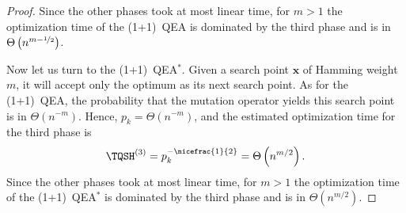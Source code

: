 \begin{proof}
Since the other phases took at most linear time, for $m>1$ the optimization time of the (1+1)~QEA is dominated by the third phase and is in $\Theta\left(n^{m-\nicefrac{1}{2}}\right)$.

Now let us turn to the (1+1)~QEA$^*$. Given a search point $\mathbf{x}$ of Hamming weight $m$, it will accept only the optimum as its next search point. As for the (1+1)~QEA, the probability that the mutation operator yields this search point is in $\Theta(n^{-m})$. Hence, $p_k = \Theta(n^{-m})$, and the estimated optimization time for the third phase is
\[
\TQSH^{(3)}=p_k^{-\nicefrac{1}{2}} = \Theta\left(n^{m/2}\right).
\]
Since the other phases took at most linear time, for $m>1$ the optimization time of the (1+1)~QEA$^*$ is dominated by the third phase and is in $\Theta\left(n^{m/2}\right)$.
\end{proof}

